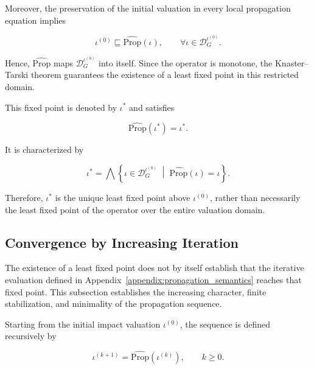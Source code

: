 \documentclass[10pt]{article}
\begin{document}
	Moreover, the preservation of the initial valuation in every local propagation
	equation implies
	
	\begin{equation}
		\iota^{(0)}
		\sqsubseteq
		\widehat{\mathrm{Prop}}(\iota),
		\qquad
		\forall
		\iota
		\in
		\mathcal D_G^{\iota^{(0)}}.
		\label{eq:operator_preserves_initial_domain}
	\end{equation}
	
	Hence,
	$\widehat{\mathrm{Prop}}$ maps
	$\mathcal D_G^{\iota^{(0)}}$ into itself. Since the operator is monotone,
	the Knaster--Tarski theorem guarantees the existence of a least fixed point in
	this restricted domain.
	
	This fixed point is denoted by $\iota^{*}$ and satisfies
	
	\begin{equation}
		\widehat{\mathrm{Prop}}
		\left(
		\iota^{*}
		\right)
		=
		\iota^{*}.
		\label{eq:least_fixed_point_above_initial}
	\end{equation}
	
	It is characterized by
	
	\begin{equation}
		\iota^{*}
		=
		\bigwedge
		\left\{
		\iota
		\in
		\mathcal D_G^{\iota^{(0)}}
		\;\middle|\;
		\widehat{\mathrm{Prop}}(\iota)
		=
		\iota
		\right\}.
		\label{eq:least_fixed_point_characterization}
	\end{equation}
	
	Therefore, $\iota^{*}$ is the unique least fixed point above
	$\iota^{(0)}$, rather than necessarily the least fixed point of the operator
	over the entire valuation domain.
	
	\subsection{Convergence by Increasing Iteration}
	
	The existence of a least fixed point does not by itself establish that the
	iterative evaluation defined in Appendix~\ref{appendix:propagation_semantics}
	reaches that fixed point. This subsection establishes the increasing character,
	finite stabilization, and minimality of the propagation sequence.
	
	Starting from the initial impact valuation $\iota^{(0)}$, the sequence is
	defined recursively by
	
	\begin{equation}
		\iota^{(k+1)}
		=
		\widehat{\mathrm{Prop}}
		\!\left(
		\iota^{(k)}
		\right),
		\qquad
		k\geq 0.
		\label{eq:kleene_iteration}
	\end{equation}
	
\end{document}
